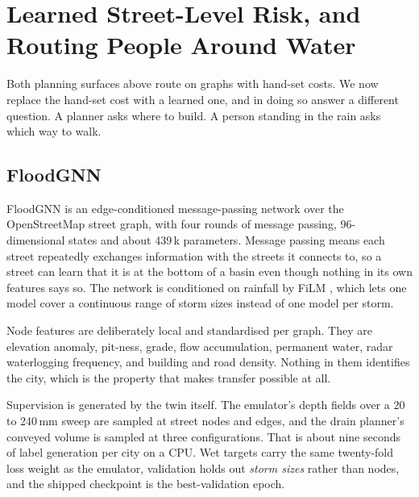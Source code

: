 \section{Learned Street-Level Risk, and Routing People Around Water}
\label{sec:gnn}

Both planning surfaces above route on graphs with hand-set costs. We now replace the hand-set cost
with a learned one, and in doing so answer a different question. A planner asks where to build. A
person standing in the rain asks which way to walk.

\subsection{FloodGNN}
FloodGNN is an edge-conditioned message-passing network \cite{gilmer2017} over the OpenStreetMap
street graph, with four rounds of message passing, 96-dimensional states and about 439\,k
parameters. Message passing means each street repeatedly exchanges information with the streets it
connects to, so a street can learn that it is at the bottom of a basin even though nothing in its
own features says so. The network is conditioned on rainfall by FiLM \cite{perez2018film}, which
lets one model cover a continuous range of storm sizes instead of one model per storm.

Node features are deliberately local and standardised per graph. They are elevation anomaly,
pit-ness, grade, flow accumulation, permanent water, radar waterlogging frequency, and building and
road density. Nothing in them identifies the city, which is the property that makes transfer
possible at all.

Supervision is generated by the twin itself. The emulator's depth fields over a 20 to 240\,mm sweep
are sampled at street nodes and edges, and the drain planner's conveyed volume is sampled at three
configurations. That is about nine seconds of label generation per city on a CPU. Wet targets carry
the same twenty-fold loss weight as the emulator, validation holds out \emph{storm sizes} rather
than nodes, and the shipped checkpoint is the best-validation epoch.

